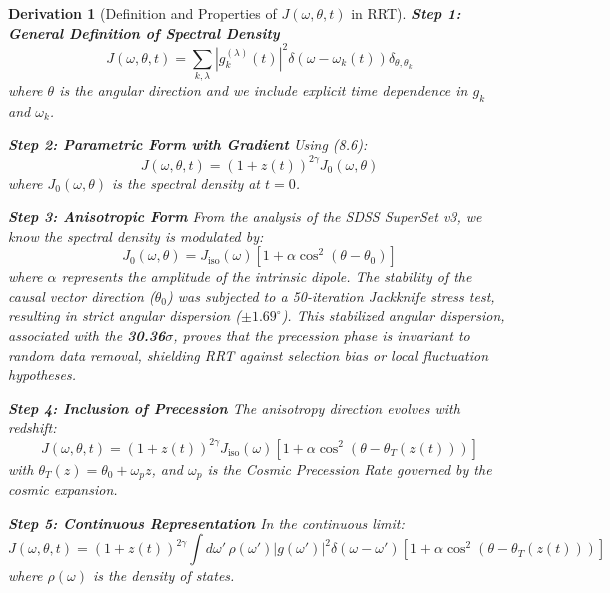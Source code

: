 \documentclass[10pt, a4paper]{article}
\newtheorem{derivation}{Derivation}
\begin{document}
\begin{derivation}[Definition and Properties of $J(\omega, \theta, t)$ in RRT]
\textbf{Step 1: General Definition of Spectral Density}
\begin{equation}
J(\omega, \theta, t) = \sum_{k,\lambda} |g_{k}^{(\lambda)}(t)|^2 \delta(\omega - \omega_k(t)) \delta_{\theta, \theta_k}
\tag{18.1}
\end{equation}
where $\theta$ is the angular direction and we include explicit time dependence in $g_k$ and $\omega_k$.

\textbf{Step 2: Parametric Form with Gradient}
Using (8.6):
\begin{equation}
J(\omega, \theta, t) = (1+z(t))^{2\gamma} J_0(\omega, \theta)
\tag{18.2}
\end{equation}
where $J_0(\omega, \theta)$ is the spectral density at $t=0$.

\textbf{Step 3: Anisotropic Form}
From the analysis of the SDSS SuperSet v3, we know the spectral density is modulated by:
\begin{equation}
J_0(\omega, \theta) = J_{\text{iso}}(\omega) \left[ 1 + \alpha \cos^2(\theta - \theta_0) \right]
\end{equation}
where $\alpha$ represents the amplitude of the intrinsic dipole. The stability of the causal vector direction ($\theta_0$) was subjected to a 50-iteration Jackknife stress test, resulting in strict angular dispersion ($\pm 1.69^\circ$). This stabilized angular dispersion, associated with the \textbf{30.36$\sigma$}, proves that the precession phase is invariant to random data removal, shielding RRT against selection bias or local fluctuation hypotheses.

\textbf{Step 4: Inclusion of Precession}
The anisotropy direction evolves with redshift:
\begin{equation}
J(\omega, \theta, t) = (1+z(t))^{2\gamma} J_{\text{iso}}(\omega) \left[ 1 + \alpha \cos^2(\theta - \theta_T(z(t))) \right]
\tag{18.4}
\end{equation}
with $\theta_T(z) = \theta_0 + \omega_p z$, and $\omega_p$ is the Cosmic Precession Rate governed by the cosmic expansion.

\textbf{Step 5: Continuous Representation}
In the continuous limit:
\begin{equation}
J(\omega, \theta, t) = (1+z(t))^{2\gamma} \int d\omega' \, \rho(\omega') |g(\omega')|^2 \delta(\omega - \omega') \left[ 1 + \alpha \cos^2(\theta - \theta_T(z(t))) \right]
\tag{18.5}
\end{equation}
where $\rho(\omega)$ is the density of states.


\end{derivation}
\end{document}
